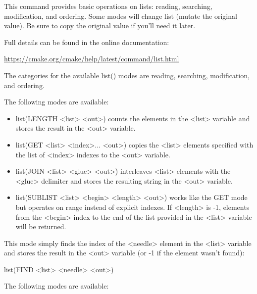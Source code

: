 
This command provides basic operations on lists: reading, searching, modification, and ordering. Some modes will change list (mutate the original value). Be sure to copy the original value if you’ll need it later.

Full details can be found in the online documentation:

\url{https://cmake.org/cmake/help/latest/command/list.html}

The categories for the available list() modes are reading, searching, modification, and ordering.


The following modes are available:

\begin{itemize}
\item
list(LENGTH <list> <out>) counts the elements in the <list> variable and stores the result in the <out> variable.

\item
list(GET <list> <index>... <out>) copies the <list> elements specified with the list of <index> indexes to the <out> variable.

\item
list(JOIN <list> <glue> <out>) interleaves <list> elements with the <glue> delimiter and stores the resulting string in the <out> variable.

\item
list(SUBLIST <list> <begin> <length> <out>) works like the GET mode but operates on range instead of explicit indexes. If <length> is -1, elements from the <begin> index to the end of the list provided in the <list> variable will be returned.
\end{itemize}


This mode simply finds the index of the <needle> element in the <list> variable and stores the result in the <out> variable (or -1 if the element wasn’t found):

\begin{cmake}
list(FIND <list> <needle> <out>)
\end{cmake}


The following modes are available:

